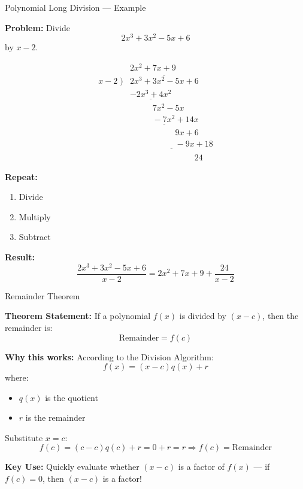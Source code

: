 \documentclass{beamer}
\begin{document}
\begin{frame}{Polynomial Long Division — Example}
\small

\textbf{Problem:} Divide
\[
2x^3 + 3x^2 - 5x + 6
\]
by \(x - 2\).

\vspace{0.25cm}
\begin{center}
\begin{minipage}{0.62\textwidth}
\centering
\setlength{\arraycolsep}{0pt}
\renewcommand{\arraystretch}{1.35}
\[
\begin{array}{rl}
  & 2x^2 + 7x + 9 \\
x - 2 \; ) & \overline{2x^3 + 3x^2 - 5x + 6} \\
  & \underline{-2x^3 + 4x^2} \\
  & \phantom{2x^3 + }7x^2 - 5x \\
  & \underline{\phantom{2x^3 + }-7x^2 + 14x} \\
  & \phantom{2x^3 + 3x^2 - }9x + 6 \\
  & \underline{\phantom{2x^3 + 3x^2 - }-9x + 18} \\
  & \phantom{2x^3 + 3x^2 - 5x + }24
\end{array}
\]
\end{minipage}%
\begin{minipage}{0.3\textwidth}
\vspace{1.2em}
\textbf{Repeat:}
\begin{enumerate}
    \item Divide
    \item Multiply
    \item Subtract
\end{enumerate}
\end{minipage}
\end{center}

\vspace{0.35cm}
\textbf{Result:}
\[
\frac{2x^3 + 3x^2 - 5x + 6}{x - 2} = 2x^2 + 7x + 9 + \frac{24}{x - 2}
\]
\end{frame}

\begin{frame}{Remainder Theorem}
\small

\textbf{Theorem Statement:}  
If a polynomial $f(x)$ is divided by $(x - c)$, then the remainder is:
\[
\text{Remainder} = f(c)
\]

\vspace{0.3cm}
\textbf{Why this works:}  
According to the Division Algorithm:
\[
f(x) = (x - c)q(x) + r
\]
where:
\begin{itemize}
    \item $q(x)$ is the quotient
    \item $r$ is the remainder
\end{itemize}

Substitute $x = c$:
\[
f(c) = (c - c)q(c) + r = 0 + r = r
\Rightarrow \boxed{f(c) = \text{Remainder}}
\]

\vspace{0.3cm}
\textbf{Key Use:}  
Quickly evaluate whether $(x - c)$ is a factor of $f(x)$ — if $f(c) = 0$, then $(x - c)$ is a factor!

\end{frame}
\end{document}
